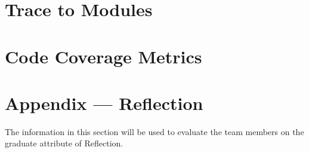 \documentclass[12pt, titlepage]{article}
\begin{document}
\section{Trace to Modules}		

\section{Code Coverage Metrics}




\newpage{}
\section*{Appendix --- Reflection}

The information in this section will be used to evaluate the team members on the
graduate attribute of Reflection.


\end{document}
